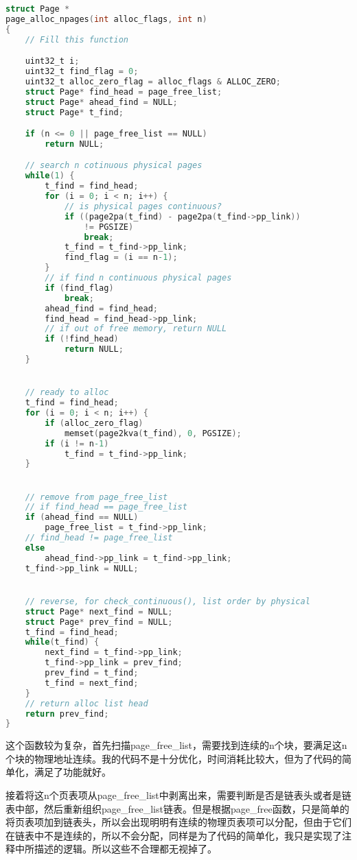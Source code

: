 \documentclass[11pt,a4paper]{article}
\begin{document}
\setmainfont{Consolas}
\begin{lstlisting}[language={C},firstnumber=435,title=kern/pmap.c] 
struct Page *
page_alloc_npages(int alloc_flags, int n)
{
	// Fill this function

	uint32_t i;
	uint32_t find_flag = 0;
	uint32_t alloc_zero_flag = alloc_flags & ALLOC_ZERO;
	struct Page* find_head = page_free_list;
	struct Page* ahead_find = NULL;
	struct Page* t_find; 

	if (n <= 0 || page_free_list == NULL)
		return NULL;

	// search n cotinuous physical pages
	while(1) {
		t_find = find_head;
		for (i = 0; i < n; i++) {
			// is physical pages continuous?
			if ((page2pa(t_find) - page2pa(t_find->pp_link)) 
				!= PGSIZE)
				break;
			t_find = t_find->pp_link;
			find_flag = (i == n-1);
		}
		// if find n continuous physical pages
		if (find_flag)
			break;
		ahead_find = find_head;
		find_head = find_head->pp_link;
		// if out of free memory, return NULL
		if (!find_head)
			return NULL;
	}


	// ready to alloc
	t_find = find_head;
	for (i = 0; i < n; i++) {
		if (alloc_zero_flag)
			memset(page2kva(t_find), 0, PGSIZE);
		if (i != n-1)
			t_find = t_find->pp_link;
	}


	// remove from page_free_list
	// if find_head == page_free_list
	if (ahead_find == NULL)
		page_free_list = t_find->pp_link;
	// find_head != page_free_list
	else
		ahead_find->pp_link = t_find->pp_link;
	t_find->pp_link = NULL;


	// reverse, for check_continuous(), list order by physical
	struct Page* next_find = NULL;
	struct Page* prev_find = NULL;
	t_find = find_head;
	while(t_find) {
		next_find = t_find->pp_link;
		t_find->pp_link = prev_find;
		prev_find = t_find;
		t_find = next_find;
	}
	// return alloc list head
	return prev_find;
}
\end{lstlisting}
\setmainfont[BoldFont=黑体]{宋体}

这个函数较为复杂，首先扫描page\_free\_list，需要找到连续的n个块，要满足这n个块的物理地址连续。我的代码不是十分优化，时间消耗比较大，但为了代码的简单化，满足了功能就好。

接着将这n个页表项从page\_free\_list中剥离出来，需要判断是否是链表头或者是链表中部，然后重新组织page\_free\_list链表。但是根据page\_free函数，只是简单的将页表项加到链表头，所以会出现明明有连续的物理页表项可以分配，但由于它们在链表中不是连续的，所以不会分配，同样是为了代码的简单化，我只是实现了注释中所描述的逻辑。所以这些不合理都无视掉了。
\end{document}
